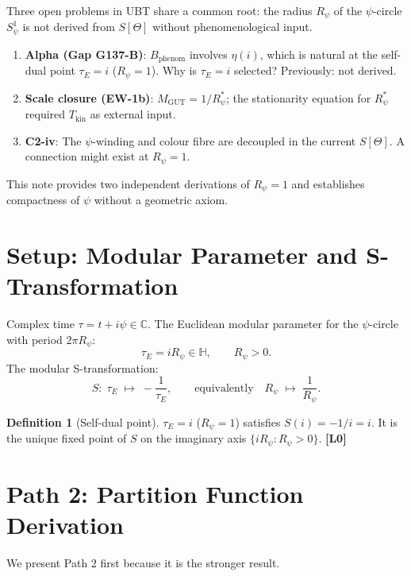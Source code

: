 \documentclass[12pt,a4paper]{article}
\theoremstyle{definition}\newtheorem{definition}[theorem]{Definition}
\theoremstyle{remark}\newtheorem{remark}[theorem]{Remark}
\newcommand{\Lz}{\textbf{[L0]}}
\begin{document}
Three open problems in UBT share a common root: the radius $R_\psi$
of the $\psi$-circle $S^1_\psi$ is not derived from $S[\Theta]$
without phenomenological input.
\begin{enumerate}
\item \textbf{Alpha (Gap G137-B)}: $B_{\mathrm{phenom}}$ involves
  $\eta(i)$, which is natural at the self-dual point $\tau_E=i$
  ($R_\psi=1$).  Why is $\tau_E=i$ selected?  Previously: not derived.
\item \textbf{Scale closure (EW-1b)}: $M_{\mathrm{GUT}}=1/R_\psi^*$;
  the stationarity equation for $R_\psi^*$ required $T_{\mathrm{kin}}$
  as external input.
\item \textbf{C2-iv}: The $\psi$-winding and colour fibre are decoupled
  in the current $S[\Theta]$.  A connection might exist at $R_\psi=1$.
\end{enumerate}

This note provides two independent derivations of $R_\psi=1$ and
establishes compactness of $\psi$ without a geometric axiom.

\section{Setup: Modular Parameter and S-Transformation}
\label{sec:setup}

Complex time $\tau=t+i\psi\in\mathbb{C}$.  The Euclidean modular
parameter for the $\psi$-circle with period $2\pi R_\psi$:
\[
  \tau_E = iR_\psi \in \mathbb{H}, \qquad
  R_\psi > 0.
\]
The modular S-transformation:
\[
  S:\;\tau_E \;\longmapsto\; -\frac{1}{\tau_E},
  \qquad\text{equivalently}\quad R_\psi \;\longmapsto\; \frac{1}{R_\psi}.
\]
\begin{definition}[Self-dual point]
$\tau_E = i$ ($R_\psi = 1$) satisfies $S(i) = -1/i = i$.
It is the unique fixed point of $S$ on the imaginary axis
$\{iR_\psi : R_\psi > 0\}$. \Lz
\end{definition}

\section{Path 2: Partition Function Derivation}
\label{sec:Z_chain}

We present Path 2 first because it is the stronger result.
\end{document}
